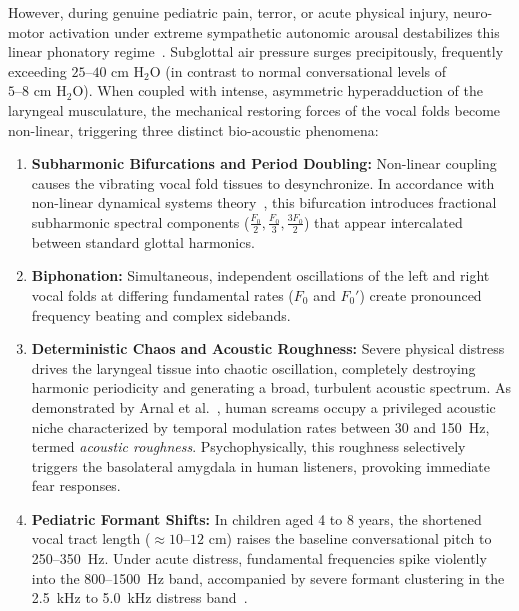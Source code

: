 \documentclass[12pt, a4paper]{report}
\begin{document}
However, during genuine pediatric pain, terror, or acute physical injury, neuro-motor activation under extreme sympathetic autonomic arousal destabilizes this linear phonatory regime~\cite{ref_fitch2002}. Subglottal air pressure surges precipitously, frequently exceeding $25\text{--}40\text{ cm }\text{H}_2\text{O}$ (in contrast to normal conversational levels of $5\text{--}8\text{ cm }\text{H}_2\text{O}$). When coupled with intense, asymmetric hyperadduction of the laryngeal musculature, the mechanical restoring forces of the vocal folds become non-linear, triggering three distinct bio-acoustic phenomena:
\begin{enumerate}
    \item \textbf{Subharmonic Bifurcations and Period Doubling:} Non-linear coupling causes the vibrating vocal fold tissues to desynchronize. In accordance with non-linear dynamical systems theory~\cite{ref_wilden1998}, this bifurcation introduces fractional subharmonic spectral components ($\frac{F_0}{2}, \frac{F_0}{3}, \frac{3F_0}{2}$) that appear intercalated between standard glottal harmonics.
    \item \textbf{Biphonation:} Simultaneous, independent oscillations of the left and right vocal folds at differing fundamental rates ($F_0$ and $F_{0}'$) create pronounced frequency beating and complex sidebands.
    \item \textbf{Deterministic Chaos and Acoustic Roughness:} Severe physical distress drives the laryngeal tissue into chaotic oscillation, completely destroying harmonic periodicity and generating a broad, turbulent acoustic spectrum. As demonstrated by Arnal et al.~\cite{ref_arnal2015}, human screams occupy a privileged acoustic niche characterized by temporal modulation rates between 30 and 150~Hz, termed \textit{acoustic roughness}. Psychophysically, this roughness selectively triggers the basolateral amygdala in human listeners, provoking immediate fear responses.
    \item \textbf{Pediatric Formant Shifts:} In children aged 4 to 8 years, the shortened vocal tract length ($\approx 10\text{--}12\text{ cm}$) raises the baseline conversational pitch to 250--350~Hz. Under acute distress, fundamental frequencies spike violently into the 800--1500~Hz band, accompanied by severe formant clustering in the 2.5~kHz to 5.0~kHz distress band~\cite{ref_sheinkopf2012, ref_mccofie2026}.
\end{enumerate}
\end{document}

